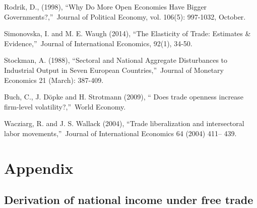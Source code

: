 \documentclass[12pt]{article}
\begin{document}
\begin{thebibliography}{99}
\bibitem{} Rodrik, D., (1998), \textquotedblleft Why Do More Open Economies
Have Bigger Governments?,\textquotedblright\ Journal of Political Economy,
vol. 106(5): 997-1032, October.

\bibitem{} Simonovska, I. and M. E. Waugh (2014), \textquotedblleft The
Elasticity of Trade: Estimates \& Evidence,\textquotedblright\ Journal of
International Economics, 92(1), 34-50.

\bibitem{} Stockman, A. (1988), \textquotedblleft Sectoral and National
Aggregate Disturbances to Industrial Output in Seven European
Countries,\textquotedblright\ Journal of Monetary Economics 21 (March):
387-409.

\bibitem{} Buch, C., J. D\"{o}pke and H. Strotmann (2009), \textquotedblleft
Does trade openness increase firm-level volatility?,\textquotedblright\
World Economy.

\bibitem{} Wacziarg, R. and J. S. Wallack (2004), \textquotedblleft Trade
liberalization and intersectoral labor movements,\textquotedblright\ Journal
of International Economics 64 (2004) 411-- 439.
\end{thebibliography}

\section*{Appendix}

\subsection*{Derivation of national income under free trade}
\end{document}

